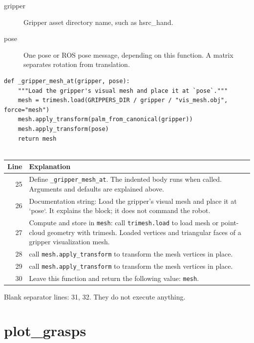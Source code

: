 \documentclass[11pt,a4paper]{book}
\begin{document}
\begin{description}
\item[gripper] Gripper asset directory name, such as hsrc\_hand.
\item[pose] One pose or ROS pose message, depending on this function. A matrix separates rotation from translation.
\end{description}

\begin{lstlisting}[firstnumber=25]
def _gripper_mesh_at(gripper, pose):
    """Load the gripper's visual mesh and place it at `pose`."""
    mesh = trimesh.load(GRIPPERS_DIR / gripper / "vis_mesh.obj", force="mesh")
    mesh.apply_transform(palm_from_canonical(gripper))
    mesh.apply_transform(pose)
    return mesh


\end{lstlisting}

\begin{longtable}{r p{}}

\textbf{Line} & \textbf{Explanation} \\ \hline \endhead

25 & Define \texttt{\_gripper\_mesh\_at}. The indented body runs when called. Arguments and defaults are explained above. \\

26 & Documentation string: Load the gripper's visual mesh and place it at `pose`. It explains the block; it does not command the robot. \\

27 & Compute and store in \texttt{mesh}: call \texttt{trimesh.load} to load mesh or point-cloud geometry with trimesh. Loaded vertices and triangular faces of a gripper visualization mesh. \\

28 & call \texttt{mesh.apply\_transform} to transform the mesh vertices in place. \\

29 & call \texttt{mesh.apply\_transform} to transform the mesh vertices in place. \\

30 & Leave this function and return the following value: \texttt{mesh}. \\

\end{longtable}

Blank separator lines: 31, 32. They do not execute anything.

\section{plot\_grasps}
\end{document}
